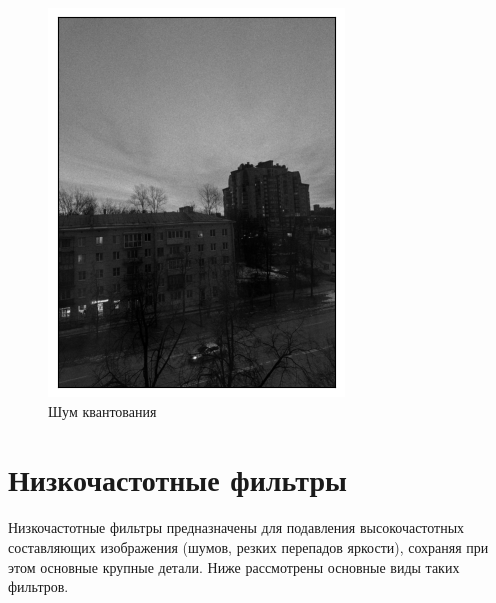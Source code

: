 \documentclass[a4paper,12pt]{article}
\begin{document}
\begin{figure}[H]
\begin{minipage}{0.49\textwidth}
        \centering \includegraphics[width=\textwidth]{results/pois.png}
        \caption{Шум квантования}
    \end{minipage}
\end{figure}

\section{Низкочастотные фильтры}
Низкочастотные фильтры предназначены для подавления высокочастотных составляющих изображения (шумов, резких перепадов яркости), сохраняя при этом основные крупные детали. Ниже рассмотрены основные виды таких фильтров.
\end{document}
